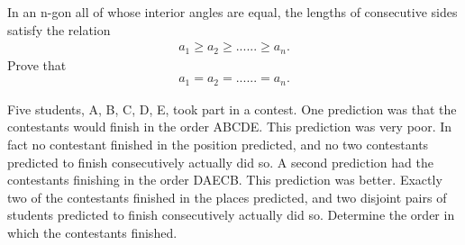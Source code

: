 \item In an n-gon all of whose interior angles are equal, the lengths of consecutive
sides satisfy the relation
\begin{align}
a_1\geq a_2 \geq...... \geq a_n.
\end{align}
Prove that 
\begin{align}
a_1 = a_2 = ......= a_n.
\end{align}
\item Five students, A, B, C, D, E, took part in a contest. One prediction was that the contestants would finish in the order ABCDE. This prediction was very poor. In fact no contestant finished in the position predicted, and no two contestants predicted to finish consecutively actually did so. A second prediction had the contestants finishing in the order DAECB. This prediction was better. Exactly two of the contestants finished in the places predicted, and two disjoint pairs of students predicted to finish consecutively actually did so. Determine the order in which the contestants finished.

    
